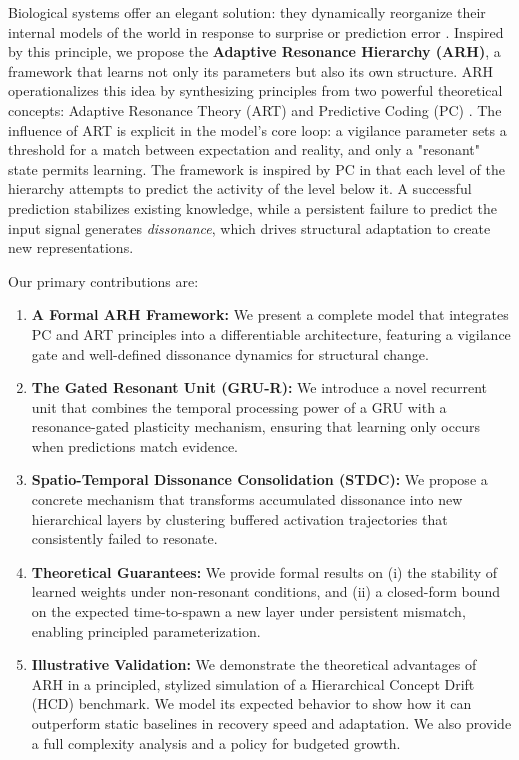 \documentclass{article}
\begin{document}
Biological systems offer an elegant solution: they dynamically reorganize their internal models of the world in response to surprise or prediction error \citep{Piaget1954}. Inspired by this principle, we propose the \textbf{Adaptive Resonance Hierarchy (ARH)}, a framework that learns not only its parameters but also its own structure. ARH operationalizes this idea by synthesizing principles from two powerful theoretical concepts: Adaptive Resonance Theory (ART) \citep{Grossberg1987} and Predictive Coding (PC) \citep{Rao1999}. The influence of ART is explicit in the model's core loop: a vigilance parameter sets a threshold for a match between expectation and reality, and only a "resonant" state permits learning. The framework is inspired by PC in that each level of the hierarchy attempts to predict the activity of the level below it. A successful prediction stabilizes existing knowledge, while a persistent failure to predict the input signal generates \emph{dissonance}, which drives structural adaptation to create new representations.

Our primary contributions are:
\begin{enumerate}
    \item \textbf{A Formal ARH Framework:} We present a complete model that integrates PC and ART principles into a differentiable architecture, featuring a vigilance gate and well-defined dissonance dynamics for structural change.
    \item \textbf{The Gated Resonant Unit (GRU-R):} We introduce a novel recurrent unit that combines the temporal processing power of a GRU with a resonance-gated plasticity mechanism, ensuring that learning only occurs when predictions match evidence.
    \item \textbf{Spatio-Temporal Dissonance Consolidation (STDC):} We propose a concrete mechanism that transforms accumulated dissonance into new hierarchical layers by clustering buffered activation trajectories that consistently failed to resonate.
    \item \textbf{Theoretical Guarantees:} We provide formal results on (i) the stability of learned weights under non-resonant conditions, and (ii) a closed-form bound on the expected time-to-spawn a new layer under persistent mismatch, enabling principled parameterization.
    \item \textbf{Illustrative Validation:} We demonstrate the theoretical advantages of ARH in a principled, stylized simulation of a Hierarchical Concept Drift (HCD) benchmark. We model its expected behavior to show how it can outperform static baselines in recovery speed and adaptation. We also provide a full complexity analysis and a policy for budgeted growth.
\end{enumerate}
\end{document}

